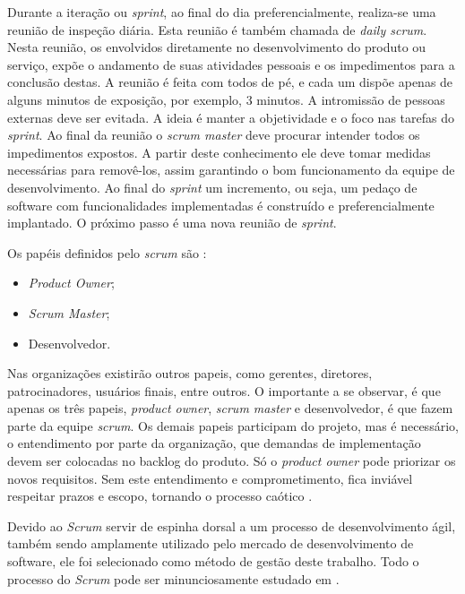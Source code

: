 Durante a iteração ou \emph{sprint}, ao final do dia preferencialmente, realiza-se uma reunião de inspeção diária. 
Esta reunião é também chamada de \emph{daily scrum}. 
Nesta reunião, os envolvidos diretamente no desenvolvimento do produto ou serviço, expõe o andamento de suas atividades pessoais e os impedimentos para a conclusão destas. 
A reunião é feita com todos de pé, e cada um dispõe apenas de alguns minutos de exposição, por exemplo, 3 minutos. 
A intromissão de pessoas externas deve ser evitada. 
A ideia é manter a objetividade e o foco nas tarefas do \emph{sprint}.
Ao final da reunião o \emph{scrum master} deve procurar intender todos os impedimentos expostos. A partir deste conhecimento ele deve tomar medidas necessárias para removê-los, assim garantindo o bom funcionamento da equipe de desenvolvimento.
Ao final do \emph{sprint} um incremento, ou seja, um pedaço de software com funcionalidades implementadas é construído e preferencialmente implantado. O próximo passo é uma nova reunião de \emph{sprint}.

Os papéis definidos pelo \emph{scrum} são \cite{Schwaber2004}:
\begin{itemize}	
	\item \emph{Product Owner};
	\item \emph{Scrum Master};
	\item Desenvolvedor.
\end{itemize}

Nas organizações existirão outros papeis, como gerentes, diretores, patrocinadores, usuários finais, entre outros. 
O importante a se observar, é que apenas os três papeis, \emph{product owner}, \emph{scrum master} e desenvolvedor, é que fazem parte da equipe \emph{scrum}. 
Os demais papeis participam do projeto, mas é necessário, o entendimento por parte da organização, que demandas de implementação devem ser colocadas no backlog do produto. 
Só o \emph{product owner} pode priorizar os novos requisitos. 
Sem este entendimento e comprometimento, fica inviável respeitar prazos e escopo, tornando o processo caótico \cite{Schwaber2004}.

Devido ao \emph{Scrum} servir de espinha dorsal a um processo de desenvolvimento ágil, também sendo amplamente utilizado pelo mercado de desenvolvimento de software, ele foi selecionado como método de gestão deste trabalho. 
Todo o processo do \emph{Scrum} pode ser minunciosamente estudado em .

